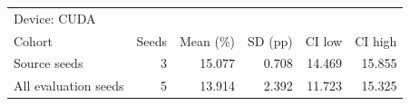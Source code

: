\begin{tabular}{lrrrrr}
\toprule
\multicolumn{6}{l}{Device: CUDA} \\
Cohort & Seeds & Mean (\%) & SD (pp) & CI low & CI high \\
\midrule
Source seeds & 3 & 15.077 & 0.708 & 14.469 & 15.855 \\
All evaluation seeds & 5 & 13.914 & 2.392 & 11.723 & 15.325 \\
\bottomrule
\end{tabular}
